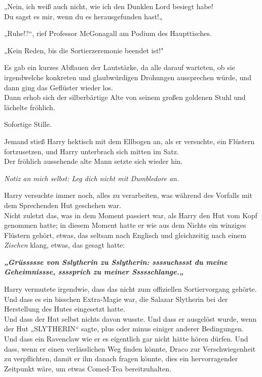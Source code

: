 {„Nein, ich weiß auch nicht, wie ich den Dunklen Lord besiegt habe!\\ Du sagst es mir, wenn du es herausgefunden hast!„

„Ruhe!?“, rief Professor McGonagall am Podium des Haupttisches.

„Kein Reden, bis die Sortierzeremonie beendet ist!"

Es gab ein kurzes Abflauen der Lautstärke, da alle darauf warteten, ob sie irgendwelche konkreten und glaubwürdigen Drohungen aussprechen würde, und dann ging das Geflüster wieder los.\\ Dann erhob sich der silberbärtige Alte von seinem großen goldenen Stuhl und lächelte fröhlich.

Sofortige Stille.

Jemand stieß Harry hektisch mit dem Ellbogen an, als er versuchte, ein Flüstern fortzusetzen, und Harry unterbrach sich mitten im Satz.\\ Der fröhlich aussehende alte Mann setzte sich wieder hin.

\emph{Notiz an mich selbst: Leg dich nicht mit Dumbledore an.}

Harry versuchte immer noch, alles zu verarbeiten, was während des Vorfalls mit dem Sprechenden Hut geschehen war.\\ Nicht zuletzt das, was in dem Moment passiert war, als Harry den Hut vom Kopf genommen hatte; in diesem Moment hatte er wie aus dem Nichts ein winziges Flüstern gehört, etwas, das seltsam nach Englisch und gleichzeitig nach einem \emph{Zischen} klang, etwas, das gesagt hatte:

\textbf{\emph{„Grüssssse von Sslytherin zu Sslytherin: ssssuchssst du meine Geheimnissse, ssssprich zu meiner Ssssschlange.„}}

Harry vermutete irgendwie, dass das nicht zum offiziellen Sortiervorgang gehörte.\\ Und dass es ein bisschen Extra-Magie war, die Salazar Slytherin bei der Herstellung des Hutes eingesetzt hatte.\\ Und dass der Hut selbst nichts davon wusste. Und dass er ausgelöst wurde, wenn der Hut „SLYTHERIN“ sagte, plus oder minus einiger anderer Bedingungen.\\ Und dass ein Ravenclaw wie er es eigentlich gar nicht hätte hören dürfen. Und dass, wenn er einen verlässlichen Weg finden könnte, Draco zur Verschwiegenheit zu verpflichten, damit er ihn danach fragen könnte, dies ein hervorragender Zeitpunkt wäre, um etwas Comed-Tea bereitzuhalten.

}
